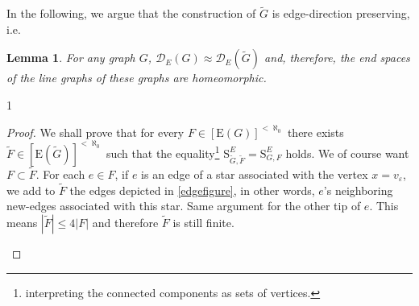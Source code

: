 \documentclass[10pt]{article}
\newcommand{\myref}[1]{\hyperref[#1]{\namecref{#1} \ref{#1}}}
\numberwithin{equation}{subsection}
\newtheorem{lemma}[equation]{Lemma}
\theoremstyle{remark}
\newcommand{\proofshow}{1}
\begin{document}
In the following, we argue that the construction of $\tilde{G}$ is edge-direction preserving, i.e. 

\begin{lemma}
\label{directionpreserving}
    For any graph $G$, $\mathcal{D}_E(G) \approx \mathcal{D}_E(\tilde{G})$ and, therefore, the end spaces of the line graphs of these graphs are homeomorphic.
\end{lemma}

\if \proofshow 1
\begin{proof}
    We shall prove that for every $F \in [\mathrm{E}(G)]^{< \aleph_0}$ there exists $\tilde{F} \in [\mathrm{E}(\tilde{G})]^{< \aleph_0}$ such that the equality\footnote{interpreting the connected components as sets of vertices.} $\mathrm{S}^{E}_{\tilde{G},\tilde{F}} = \mathrm{S}^E_{G,F}$ holds. We of course want $F \subset \tilde{F}$. For each $e \in F$, if $e$ is an edge of a star associated with the vertex $x = v_\varepsilon$, we add to $\tilde{F}$ the edges depicted in \myref{edgefigure}, in other words, $e$'s neighboring new-edges associated with this star. Same argument for the other tip of $e$. This means $|\tilde{F}|\leq 4|F|$ and therefore $\tilde{F}$ is still finite.\\

    \begin{figure}[ht!]
    \begin{minipage}{0.5\textwidth}
    \centering
    \end{minipage}%
    \begin{minipage}{0.5\textwidth}
    \centering
\end{minipage}
\end{figure}
\end{proof}
\end{document}
